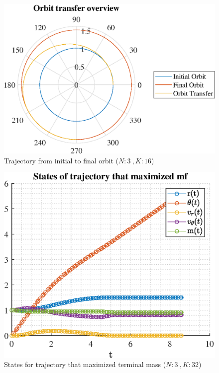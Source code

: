 \documentclass[]{article}
\begin{document}
	\begin{figure}
		\centering
		\includegraphics[scale=0.75]{orbit_N3_K16_C3_mf.eps}
		\caption{Trajectory from initial to final orbit (\(N:3\ , K:16\))}
		\label{fig:orbit_N3_K16_C3_mf}
	\end{figure}
	\begin{figure}
		\centering
		\includegraphics[scale=0.75]{states_N3_K32_C3_mf.eps}
		\caption{States for trajectory that maximized terminal mass (\(N:3\ , K:32\))}
		\label{fig:states_N3_K32_C3_mf}
	\end{figure}
\end{document}
